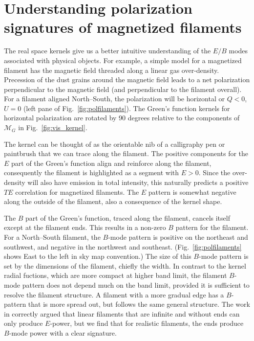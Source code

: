 \documentclass[a4paper,11pt]{article}
\newcommand{\mm}{\mathcal{M}}
\def\fig#1{{Fig.~\ref{#1}}}
\begin{document}
\section{Understanding polarization signatures of magnetized filaments}
\label{sec:pol_filaments}

The real space kernels give us a better intuitive understanding of the $E/B$ modes associated with physical objects.  For example, a simple model for a magnetized filament has the magnetic field threaded along a linear gas over-density.  Precession of the dust grains around the magnetic field leads to a net polarization perpendicular to the magnetic field (and perpendicular to the filament overall).  For a filament aligned North--South, the polarization will be horizontal or $Q<0$, $U=0$ (left pane of \fig{fig:polfilaments}).  The Green's function kernels for horizontal polarization are rotated by 90 degrees relative to the components of $\mm_G$ in \fig{fig:vis_kernel}.

The kernel can be thought of as the orientable nib of a calligraphy pen or paintbrush that we can trace along the filament.  The positive components for the $E$ part of the Green's function align and reinforce along the filament, consequently the filament is highlighted as a segment with $E>0$.  Since the over-density will also have emission in total intensity, this naturally predicts a positive $TE$ correlation for magnetized filaments.  The $E$ pattern is somewhat negative along the outside of the filament, also a consequence of the kernel shape.

The $B$ part of the Green's function, traced along the filament, cancels itself except at the filament ends.  This results in a non-zero $B$ pattern for the filament.  
 For a North--South filament, the $B$-mode pattern is positive on the northeast and southwest, and negative in the northwest and southeast. (\fig{fig:polfilaments} shows East to the left in sky map convention.)  The size of this $B$-mode pattern is set by the dimensions of the filament, chiefly the width.  In contrast to the kernel radial fuctions, which are more compact at higher band limit, the filament $B$-mode  pattern does not depend much on the band limit, provided it is sufficient to resolve the filament structure.  A filament with a more gradual edge has a $B$-pattern that is more spread out, but follows the same general structure.  The work in \cite{Zaldarriaga2001a} correctly argued that linear filaments that are infinite and without ends can only produce $E$-power, but we find that for realistic filaments, the ends produce $B$-mode power with a clear signature. 
\end{document}
